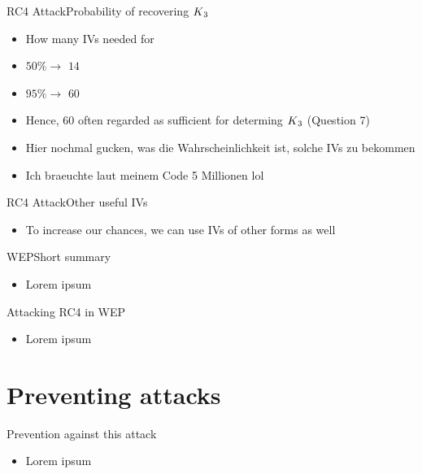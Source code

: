 \documentclass[
	aspectratio=169,	%
	onlytextwidth,		%
	t,					%
	]{beamer}
\begin{document}
\begin{frame}[fragile]{RC4 Attack}{Probability of recovering $K\textsubscript{3}$}
	\begin{itemize}
		\item How many IVs needed for 
		\item $50\% \rightarrow$ $14$
		\item $95\% \rightarrow$ $60$
		\item Hence, $60$ often regarded as sufficient for determing $K\textsubscript{3}$ (Question 7)
		\item Hier nochmal gucken, was die Wahrscheinlichkeit ist, solche IVs zu bekommen 
		\item Ich braeuchte laut meinem Code 5 Millionen lol
	\end{itemize}
\end{frame}

\begin{frame}[fragile]{RC4 Attack}{Other useful IVs}
	\begin{itemize}
		\item To increase our chances, we can use IVs of other forms as well
	\end{itemize}
\end{frame}

\begin{frame}[fragile]{WEP}{Short summary}
	\begin{itemize}
		\item Lorem ipsum
	\end{itemize}
\end{frame}

\begin{frame}[fragile]{Attacking RC4 in WEP}
	\begin{itemize}
		\item Lorem ipsum
	\end{itemize}
\end{frame}

\section{Preventing attacks}

\begin{frame}[fragile]{Prevention against this attack}
	\begin{itemize}
		\item Lorem ipsum
	\end{itemize}
\end{frame}

\appendix
\makethankyou

\section{\appendixname}
\end{document}
